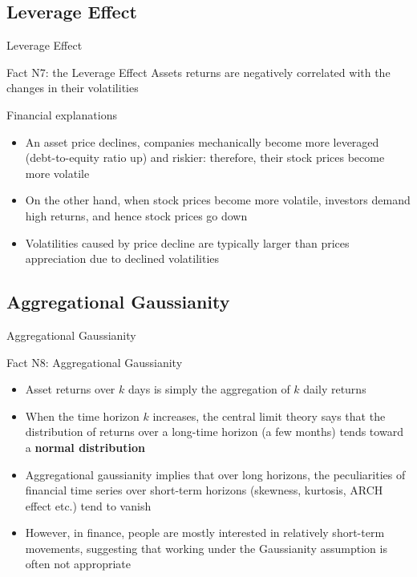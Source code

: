 \documentclass{beamer}
\begin{document}
\subsection{Leverage Effect}
\begin{frame}{Leverage Effect}

  \begin{exampleblock}{Fact N7: the Leverage Effect}
Assets returns are negatively correlated with the changes in their volatilities    
  \end{exampleblock}
  \medskip
  Financial explanations
    \begin{itemize}
    \item An asset price declines, companies mechanically become more leveraged (debt-to-equity ratio up) and riskier: therefore, their stock prices become more volatile
    \item On the other hand, when stock prices become more volatile, investors demand high returns, and hence stock prices go down
    \item Volatilities caused by price decline are typically larger than prices appreciation due to declined volatilities
    \end{itemize}
\end{frame}

\subsection{Aggregational Gaussianity}
\begin{frame}{Aggregational Gaussianity}

  \begin{exampleblock}{Fact N8: Aggregational Gaussianity}
    \begin{itemize}
    \item Asset returns over $k$ days is simply the aggregation of $k$ daily returns
    \item When the time horizon $k$ increases, the central limit theory says that the distribution of returns over a long-time horizon (a few months) tends toward a \textbf{normal distribution}
    \end{itemize}
  \end{exampleblock}


  \begin{itemize}
  \item Aggregational gaussianity implies that over long horizons, the peculiarities of financial time series over short-term horizons (skewness, kurtosis, ARCH effect etc.) tend to vanish
  \item However, in finance, people are mostly interested in relatively short-term movements, suggesting that working under the Gaussianity assumption is often not appropriate
  \end{itemize}
  
\end{frame}
\end{document}
